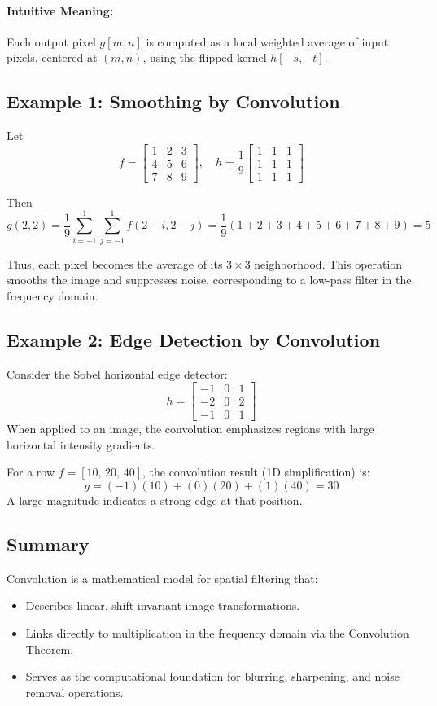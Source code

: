 \documentclass{AnantDocumentation}
\begin{document}
\paragraph{Intuitive Meaning:}
Each output pixel $g[m, n]$ is computed as a local weighted average of input pixels, centered at $(m, n)$, using the flipped kernel $h[-s, -t]$.

\subsection{Example 1: Smoothing by Convolution}

Let
\[
f =
\begin{bmatrix}
1 & 2 & 3 \\
4 & 5 & 6 \\
7 & 8 & 9
\end{bmatrix}, \quad
h = \frac{1}{9}
\begin{bmatrix}
1 & 1 & 1 \\
1 & 1 & 1 \\
1 & 1 & 1
\end{bmatrix}
\]

Then
\[
g(2,2) = \frac{1}{9} \sum_{i=-1}^{1}\sum_{j=-1}^{1} f(2-i,2-j)
= \frac{1}{9}(1+2+3+4+5+6+7+8+9) = 5
\]

Thus, each pixel becomes the average of its $3\times3$ neighborhood.  
This operation smooths the image and suppresses noise, corresponding to a low-pass filter in the frequency domain.

\subsection{Example 2: Edge Detection by Convolution}

Consider the Sobel horizontal edge detector:
\[
h =
\begin{bmatrix}
-1 & 0 & 1 \\
-2 & 0 & 2 \\
-1 & 0 & 1
\end{bmatrix}
\]
When applied to an image, the convolution emphasizes regions with large horizontal intensity gradients.

For a row
$f = [10,\, 20,\, 40]$,  
the convolution result (1D simplification) is:
\[
g = (-1)(10) + (0)(20) + (1)(40) = 30
\]
A large magnitude indicates a strong edge at that position.

\subsection{Summary}
Convolution is a mathematical model for spatial filtering that:
\begin{itemize}
\item Describes linear, shift-invariant image transformations.
\item Links directly to multiplication in the frequency domain via the Convolution Theorem.
\item Serves as the computational foundation for blurring, sharpening, and noise removal operations.
\end{itemize}
\end{document}
